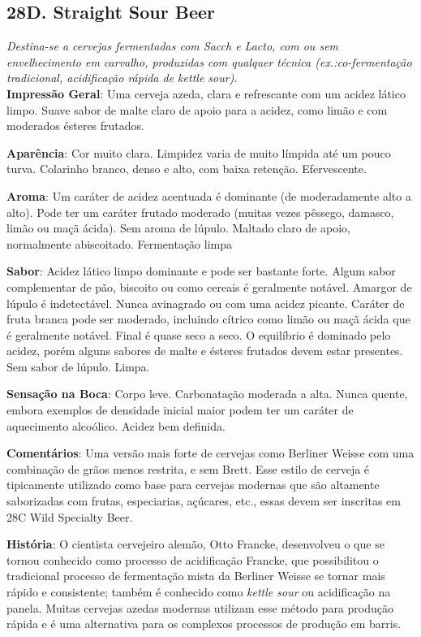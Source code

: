 \subsection*{28D. Straight Sour Beer}
\textit{Destina-se a cervejas fermentadas com Sacch e Lacto, com ou sem envelhecimento em carvalho, produzidas com qualquer técnica (ex.:co-fermentação tradicional, acidificação rápida de kettle sour).}\\
\textbf{Impressão Geral}: Uma cerveja azeda, clara e refrescante com um acidez lático limpo. Suave sabor de malte claro de apoio para a acidez, como limão e com moderados ésteres frutados.

\textbf{Aparência}: Cor muito clara. Limpidez varia de muito límpida até um pouco turva. Colarinho branco, denso e alto, com baixa retenção. Efervescente.

\textbf{Aroma}: Um caráter de acidez acentuada é dominante (de moderadamente alto a alto). Pode ter um caráter frutado moderado (muitas vezes pêssego, damasco, limão ou maçã ácida). Sem aroma de lúpulo. Maltado claro de apoio, normalmente abiscoitado. Fermentação limpa

\textbf{Sabor}: Acidez lático limpo dominante e pode ser bastante forte. Algum sabor complementar de pão, biscoito ou como cereais é geralmente notável. Amargor de lúpulo é indetectável. Nunca avinagrado ou com uma acidez picante. Caráter de fruta branca pode ser moderado, incluindo cítrico como limão ou maçã ácida que é geralmente notável. Final é quase seco a seco. O equilíbrio é dominado pelo acidez, porém alguns sabores de malte e ésteres frutados devem estar presentes. Sem sabor de lúpulo. Limpa.

\textbf{Sensação na Boca}: Corpo leve. Carbonatação moderada a alta. Nunca quente, embora exemplos de densidade inicial maior podem ter um caráter de aquecimento alcoólico. Acidez bem definida.

\textbf{Comentários}: Uma versão mais forte de cervejas como Berliner Weisse com uma combinação de grãos menos restrita, e sem Brett. Esse estilo de cerveja é tipicamente utilizado como base para cervejas modernas que são altamente saborizadas com frutas, especiarias, açúcares, etc., essas devem ser inscritas em 28C Wild Specialty Beer.

\textbf{História}: O cientista cervejeiro alemão, Otto Francke, desenvolveu o que se tornou conhecido como processo de acidificação Francke, que possibilitou o tradicional processo de fermentação mista da Berliner Weisse se tornar mais rápido e consistente; também é conhecido como \textit{kettle sour} ou acidificação na panela. Muitas cervejas azedas modernas utilizam esse método para produção rápida e é uma alternativa para os complexos processos de produção em barris.


